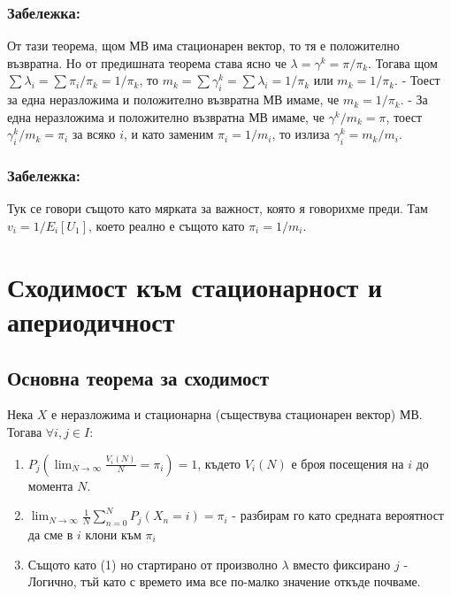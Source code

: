 \documentclass{article}
\begin{document}
\subsubsection*{Забележка:}
От тази теорема, щом МВ има стационарен вектор, то тя е положително възвратна. Но от предишната теорема става 
ясно че $\lambda = \gamma^k = \pi/\pi_k$. Тогава щом $\sum \lambda_i = \sum \pi_i/\pi_k = 1/\pi_k$, то $m_k = \sum \gamma_i^k = \sum \lambda_i = 1/\pi_k$ или $m_k = 1/\pi_k$. 
- Тоест за една неразложима и положително възвратна МВ имаме, че $m_k = 1/\pi_k$. 
- За една неразложима и положително възвратна МВ имаме, че $\gamma^k/m_k = \pi$, тоест $\gamma_i^k/m_k = \pi_i$ за всяко $i$, и като заменим $\pi_i = 1/m_i$, то излиза $\gamma_i^k = m_k/m_i$.

\subsubsection*{Забележка:}
Тук се говори същото като мярката за важност, която я говорихме преди. Там $v_i = 1/E_i[U_1]$, което реално е същото като $\pi_i = 1/m_i$.

\section{Сходимост към стационарност и апериодичност}

\subsection{Основна теорема за сходимост}
Нека $X$ е неразложима и стационарна (съществува стационарен вектор) МВ. Тогава $\forall i,j \in I$:
\begin{enumerate}
\item $P_j\left(\lim_{N\to\infty} \frac{V_i(N)}{N} = \pi_i\right) = 1$, където $V_i(N)$ е броя посещения на $i$ до момента $N$.
\item $\lim_{N\to\infty} \frac{1}{N}\sum_{n=0}^N P_j(X_n = i) = \pi_i$ - разбирам го като средната вероятност да сме в $i$ клони към $\pi_i$
\item Същото като (1) но стартирано от произволно $\lambda$ вместо фиксирано $j$ - Логично, тъй като с времето има все по-малко значение откъде почваме.
\end{enumerate}
\end{document}
